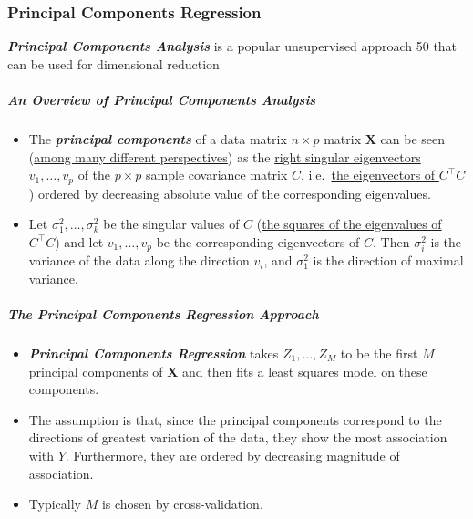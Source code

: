 \documentclass[11pt]{article}
\providecommand{\tightlist}{%
      \setlength{\itemsep}{0pt}\setlength{\parskip}{0pt}}
\begin{document}
    \hypertarget{principal-components-regression}{%
\subsubsection{Principal Components
Regression}\label{principal-components-regression}}

    \textbf{\emph{Principal Components Analysis}} is a popular unsupervised
approach 50 that can be used for dimensional reduction

    \hypertarget{an-overview-of-principal-components-analysis}{%
\subparagraph{An Overview of Principal Components
Analysis}\label{an-overview-of-principal-components-analysis}}

    \begin{itemize}
\item
  The \textbf{\emph{principal components}} of a data matrix
  \(n\times p\) matrix \(\mathbf{X}\) can be seen
  (\href{https://en.wikipedia.org/wiki/Principal_component_analysis}{among
  many different perspectives}) as the
  \href{https://en.wikipedia.org/wiki/Principal_component_analysis\#Computing_PCA_using_the_covariance_method}{right
  singular eigenvectors} \(v_1, \dots, v_p\) of the \(p\times p\) sample
  covariance matrix \(C\),
  i.e.~\href{https://en.wikipedia.org/wiki/Singular_value_decomposition}{the
  eigenvectors of \(C^{\top}C\)}) ordered by decreasing absolute value
  of the corresponding eigenvalues.
\item
  Let \(\sigma_1^2,\dots, \sigma_k^2\) be the singular values of \(C\)
  (\href{https://people.cs.pitt.ed0u/~milos/courses/cs3750-Fall2007/lectures/PCA.pdf}{the
  squares of the eigenvalues of \(C^{\top}C\)}) and let
  \(v_1, \dots, v_p\) be the corresponding eigenvectors of \(C\). Then
  \(\sigma_i^2\) is the variance of the data along the direction
  \(v_i\), and \(\sigma_1^2\) is the direction of maximal variance.
\end{itemize}

    \hypertarget{the-principal-components-regression-approach}{%
\subparagraph{The Principal Components Regression
Approach}\label{the-principal-components-regression-approach}}

    \begin{itemize}
\tightlist
\item
  \textbf{\emph{Principal Components Regression}} takes
  \(Z_1,\dots, Z_M\) to be the first \(M\) principal components of
  \(\mathbf{X}\) and then fits a least squares model on these
  components.
\item
  The assumption is that, since the principal components correspond to
  the directions of greatest variation of the data, they show the most
  association with \(Y\). Furthermore, they are ordered by decreasing
  magnitude of association.
\item
  Typically \(M\) is chosen by cross-validation.
\end{itemize}
\end{document}

